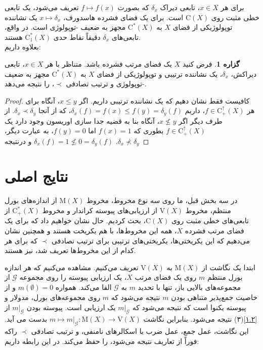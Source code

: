 \documentclass[12pt,a4paper]{article}
\theoremstyle{definition}
\theoremstyle{theorem}
\newtheorem{proposition}[definition]{گزاره}
\theoremstyle{definition}
\newcommand{\cG}{\mathcal{G}}
\newcommand{\rM}{\mathrm{M}}
\newcommand{\rC}{\mathrm{C}}
\begin{document}
برای هر 
$ x\in X $، تابعی دیراک
$ \delta_{x} $
که بصورت 
$ f\mapsto f(x) $
تعریف می‌شود،  یک تابعی خطی مثبت روی 
$ \rC(X) $
است. برای یک فضای فشرده هاسدورف،
$ x\mapsto \delta_{x} $
یک نشاننده توپولوژیکی از فضای 
$ X $
به 
$ \rC^{*}(X) $
مجهز به
ضعیف 
 \lr{*}
-توپولوژی است. در واقع، تابعی‌های
$ \delta_{x} $
دقیقاً نقاط حدی 
$ \mathrm{C}_{1}^{*}(X)  $
هستند.\\
بعلاوه داریم:
\begin{proposition}\label{4.2} 
فرض کنید
$ X $
یک فضای مرتب فشرده باشد.   متناظر با هر 
$ x\in X $، تابعی دیراکش،
$ \delta_{x} $، یک نشاننده ترتیبی و توپولوژیکی از  فضای
$ X $
به 
$ \rC^{*}(X) $
مجهز به
\linebreak
ضعیف 
 \lr{**}
-توپولوژی و ترتیب تصادفی 
$ \prec $، را نتیجه می‌دهد.
\end{proposition}
\begin{proof}
کافیست فقط نشان دهیم که یک نشاننده ترتیبی داریم.  اگر
$ x\leq y $، آنگاه برای هر 
$ f\in \rC_{+}^{\uparrow}(X)$،   داریم 
$ \delta_{x}(f)=f(x)\leq f(y)=\delta_{y}(f) $، که از آنجا
$ \delta_{x}\prec \delta_{y} $.  از طرف دیگر اگر 
$ x\nleq y $، آنگاه بنا به قضیه جدا سازی اوریسون وجود دارد یک 
$ f\in \rC_{+}^{\uparrow}(X) $
بطوری که 
$ f(x)=1 $
اما 
$ f(y)=0 $، به عبارت دیگر،  
$ \delta_{x}(f)=1\nleq 0=\delta_{y}(f) $
و درنتیجه 
$ .\delta_{x}\nprec \delta_{y} $

\end{proof}

\section{نتایج اصلی}
در سه بخش قبل، ما روی سه نوع مخروط،  مخروط 
$ \rM(X) $
از اندازه‌های بورل منتظم، مخروط 
$ \mathrm{V}(X) $ 
از ارزیابی‌های پیوسته کراندار و مخروط 
$ \rC_{+}^{*}(X) $
از تابعی‌های خطی مثبت روی
$ \rC(X) $،  بحث کردیم.  حال نشان خواهیم داد که برای یک فضای مرتب فشرده 
$ X $، همه این مخروط‌ها،  با هم یکریخت هستند و همچنین نشان می‌دهیم که این یکریختی‌ها، یکریختی‌های  ترتیبی برای ترتیب تصادفی 
$ \prec $
که برای هر کدام از این مخروط‌ها تعریف شد،  نیز هستند.

ابتدا یک نگاشت از
$ \rM(X) $
به
$ \mathrm{V}(X) $
تعریف می‌کنیم.  مشاهده می‌کنیم که هر اندازه بورل منتظم
$ m $
روی یک فضای مرتب
$ X $، یک ارزیابی پیوسته را روی مجموعه  
$ \cG $
از مجموعه‌های بالایی باز، تنها با تحدید 
$ m $
به
$ \cG $
القا می‌کند.  همواره 
$ m(\emptyset)=0 $
و از خاصیت جمع‌پذیر متناهی بودن 
$ m $
نتیجه می‌شود که  
$ m $
روی مجموعه‌های بورل،  مدولار و پیوسته یکنوا است که نتیجه می‌شود که 
$ m |_{\cG} $
یک ارزیابی  است.  پیوسته بودن
$ m|_{\cG} $
از
\ref{۱.۲}(۳) نتیجه می‌شود.  بنابراین نگاشت 
$ m\mapsto  m|_{\cG}:\rM(X)\rightarrow \mathrm{V}(X)$
بدست می آید.  این نگاشت، عمل جمع، عمل ضرب با اسکالرهای نامنفی، و ترتیب تصادفی   
$ \prec $
راکه فوراً از تعاریف نتیجه می‌شود، را حفظ می‌کند.  در این رابطه داریم:
\end{document}
